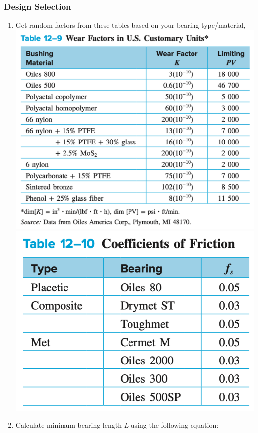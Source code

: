 \documentclass[11pt, fleqn]{article}
\begin{document}
\subsubsection{Design Selection}
\begin{enumerate}
    \item Get random factors from these tables based on your bearing type/material,\\
    \includegraphics[scale=0.6]{Bearings/wear-factors.png}\\
    \includegraphics[scale=0.6]{Bearings/friction-coefficients.png}
    \item Calculate minimum bearing length $L$ using the following equation:

\end{enumerate}
\end{document}
